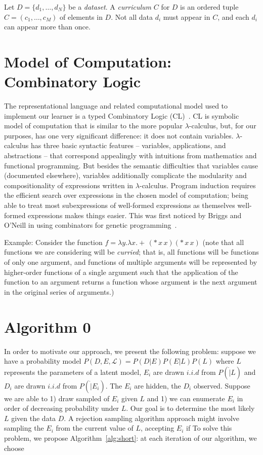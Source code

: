 \documentclass{article}
\begin{document}
Let $D= \{d_1, \dots, d_N\}$ be a \emph{dataset}. A \emph{curriculum}
$C$ for $D$ is an ordered tuple $C = (c_1, \dots, c_M)$ of elements in
$D$. Not all data $d_i$ must appear in $C$, and each $d_i$ can appear
more than once.

\section{Model of Computation: Combinatory Logic}
The representational language and related computational model used to
implement our learner is a typed Combinatory Logic
(CL)~\cite{hindley1972introduction}. CL is symbolic model of
computation that is similar to the more popular $\lambda$-calculus,
but, for our purposes, has one very significant difference: it does
not contain variables. $\lambda$-calculus has three basic syntactic
features -- variables, applications, and abstractions -- that
correspond appealingly with intuitions from mathematics and functional
programming. But besides the semantic difficulties that variables
cause (documented elsewhere), variables additionally complicate the
modularity and compositionality of expressions written in
$\lambda$-calculus. Program induction requires the efficient search
over expressions in the chosen model of computation; being able to
treat most subexpressions of well-formed expressions as themselves
well-formed expressions makes things easier. This was first noticed by
Briggs and O'Neill in using combinators for genetic
programming~\cite{briggs2006functional}. 

Example: Consider the function $f = \lambda y. \lambda x. +\,
(*\, x\, x) (*\, x\, x)$ (note that all functions we are considering
will be \emph{curried}; that is, all functions will be functions of
only one argument, and functions of multiple arguments will be
represented by higher-order functions of a single argument such that
the application of the function to an argument returns a function
whose argument is the next argument in the original series of
arguments.)



\section{Algorithm 0}
In order to motivate our approach, we present the following problem:
suppose we have a probability model $P(D, E, \mathcal{L}) = P(D|E)
P(E|L) P(L)$ where $L$ represents the parameters of a latent model,
$E_i$ are drawn $i.i.d$ from $P(\dot | L)$ and $D_i$ are drawn $i.i.d$
from $P(\dot|E_i)$. The $E_i$ are hidden, the $D_i$ observed. Suppose
we are able to 1) draw sampled of $E_i$ given $L$ and 1) we can
enumerate $E_i$ in order of decreasing probability under $L$. Our goal
is to determine the most likely $L$ given the data $D$. A rejection
sampling algorithm approach might involve sampling the $E_i$ from the
current value of $L$, accepting $E_i$ if  To solve this problem, we propose
Algorithm~\ref{alg:short}: at each iteration of our algorithm, we
choose
\end{document}
